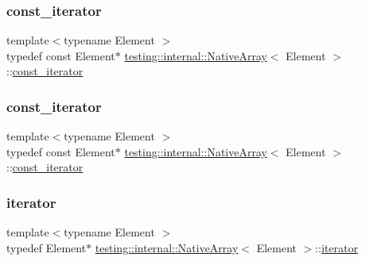 \subsubsection{\texorpdfstring{const\_iterator}{const\_iterator}\hspace{0.1cm}{\footnotesize\ttfamily [2/3]}}
{\footnotesize\ttfamily template$<$typename Element $>$ \\
typedef const Element$\ast$ \mbox{\hyperlink{classtesting_1_1internal_1_1_native_array}{testing\+::internal\+::\+Native\+Array}}$<$ Element $>$\+::\mbox{\hyperlink{classtesting_1_1internal_1_1_native_array_a9ce7c8408460d7158a2870456d134557}{const\+\_\+iterator}}}

\mbox{\label{classtesting_1_1internal_1_1_native_array_a9ce7c8408460d7158a2870456d134557}} 
\subsubsection{\texorpdfstring{const\_iterator}{const\_iterator}\hspace{0.1cm}{\footnotesize\ttfamily [3/3]}}
{\footnotesize\ttfamily template$<$typename Element $>$ \\
typedef const Element$\ast$ \mbox{\hyperlink{classtesting_1_1internal_1_1_native_array}{testing\+::internal\+::\+Native\+Array}}$<$ Element $>$\+::\mbox{\hyperlink{classtesting_1_1internal_1_1_native_array_a9ce7c8408460d7158a2870456d134557}{const\+\_\+iterator}}}

\mbox{\label{classtesting_1_1internal_1_1_native_array_ac1301a57977b57a1ad013e4e25fc2a72}} 
\subsubsection{\texorpdfstring{iterator}{iterator}\hspace{0.1cm}{\footnotesize\ttfamily [1/3]}}
{\footnotesize\ttfamily template$<$typename Element $>$ \\
typedef Element$\ast$ \mbox{\hyperlink{classtesting_1_1internal_1_1_native_array}{testing\+::internal\+::\+Native\+Array}}$<$ Element $>$\+::\mbox{\hyperlink{classtesting_1_1internal_1_1_native_array_ac1301a57977b57a1ad013e4e25fc2a72}{iterator}}}


